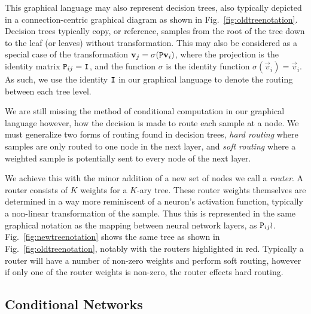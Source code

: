 \documentclass[thesis]{subfiles}
\begin{document}
This graphical language may also represent decision trees, also typically depicted in a connection-centric graphical diagram as shown in Fig.~\ref{fig:oldtreenotation}. Decision trees typically copy, or reference, samples from the root of the tree down to the leaf (or leaves) without transformation. This may also be considered as a special case of the transformation $\vec v_j = \sigma(\mat P \vec v_i)$, where the projection is the identity matrix $\mat P_{ij} = \mat I$, and the function $\sigma$ is the identity function $\sigma(\vec v_i) = \vec v_i$. As such, we use the identity $\mat I$ in our graphical language to denote the routing between each tree level. 

We are still missing the method of conditional computation in our graphical language however, \ie how the decision is made to route each sample at a node. We must generalize two forms of routing found in decision trees, \emph{hard routing} where samples are only routed to one node in the next layer, and \emph{soft routing} where a weighted sample is potentially sent to every node of the next layer.

We achieve this with the minor addition of a new set of nodes we call a \emph{router}. A router consists of $K$ weights for a $K$-ary tree. These router weights themselves are determined in a way more reminiscent of a neuron's activation function, typically a non-linear transformation of the sample. Thus this is represented in the same graphical notation as the mapping between neural network layers, \ie as $\mat P_{ij} \wr$. Fig.~\ref{fig:newtreenotation} shows the same tree as shown in Fig.~\ref{fig:oldtreenotation}, notably with the routers highlighted in red. Typically a router will have a number of non-zero weights and perform soft routing, however if only one of the router weights is non-zero, the router effects hard routing. 

\subsection{Conditional Networks}
\end{document}
